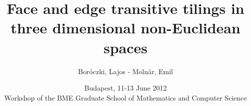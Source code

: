 \usepackage[english]{babel}
\usepackage[T1]{fontenc}
\usepackage[utf8]{inputenc}
\usepackage{graphicx}
\usepackage{listings}
\usepackage{amsmath}
\usepackage{amssymb}
\usepackage{ae,aecompl}
\usepackage{fix-cm}


\beamertemplatenavigationsymbolsempty
\beamertemplatetextbibitems

\newcommand{\leftexp}[2]{{\vphantom{#2}}^{#1}{#2}}


\title{Face and edge transitive tilings in three dimensional non-Euclidean
spaces}
\author{Boróczki, Lajos - Molnár, Emil}
\date{Budapest, 11-13 June 2012 \\{\tiny Workshop of the BME Graduate School of
Mathematics and Computer Science}}



\begin{frame}
  \maketitle
\end{frame}

\begin{frame}
  \tableofcontents
\end{frame}
\newpage

